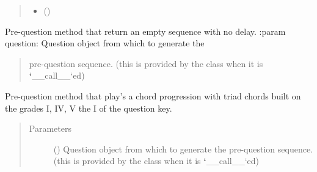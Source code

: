 \documentclass[letterpaper,10pt,english]{sphinxmanual}
\begin{document}
\begin{fulllineitems}
\begin{fulllineitems}
\begin{quote}
\begin{description}
\begin{itemize}
\item {} 
 () \textendash{} 

\end{itemize}

\end{description}\end{quote}

\end{fulllineitems}


\end{fulllineitems}


\begin{fulllineitems}
\label{\detokenize{birdears:birdears.prequestion.none}}
Pre-question method that return an empty sequence with no delay.
:param question: Question object from which to generate the
\begin{quote}

pre-question sequence. (this is provided by the  class
when it is {\color{red}\bfseries{}{}`}\_\_call\_\_{}`ed)
\end{quote}
\begin{quote}\begin{description}
\end{description}\end{quote}

\end{fulllineitems}


\begin{fulllineitems}
\label{\detokenize{birdears:birdears.prequestion.progression_i_iv_v_i}}
Pre-question method that play’s a chord progression with triad chords
built on the grades I, IV, V the I of the question key.
\begin{quote}\begin{description}
\item[{Parameters}] \leavevmode
{} () \textendash{} Question object from which to generate the
pre-question sequence. (this is provided by the  class
when it is {\color{red}\bfseries{}{}`}\_\_call\_\_{}`ed)

\end{description}\end{quote}

\end{fulllineitems}
\end{document}

